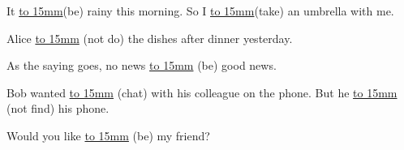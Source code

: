 
\item{
    It \underline{\hbox to 15mm{}}(be) rainy this morning. So I \underline{\hbox to 15mm{}}(take) an umbrella with me.
}
\\
\item{
    Alice \underline{\hbox to 15mm{}} (not do) the dishes after dinner yesterday.
}
\\
\item{
    As the saying goes, no news \underline{\hbox to 15mm{}} (be) good news.
}
\\
\item{
    Bob wanted \underline{\hbox to 15mm{}} (chat) with his colleague on the phone. But he \underline{\hbox to 15mm{}} (not find) his phone.
}
\\
\item{
    Would you like \underline{\hbox to 15mm{}} (be) my friend?
}
